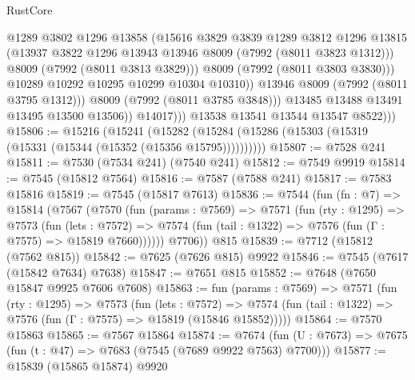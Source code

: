 \begin{lexlean}{RustCore}
\begin{coremodule}
                              @1289
                              @3802
                              @1296
                              @13858
                              (@15616
                                @3829
                                @3839
                                @1289
                                @3812
                                @1296
                                @13815
                                (@13937 @3822 @1296 @13943 @13946 @8009 (@7992 (@8011 @3823 @1312)))
                                @8009
                                (@7992 (@8011 @3813 @3829)))
                              @8009
                              (@7992 (@8011 @3803 @3830)))
                            @10289
                            @10292
                            @10295
                            @10299
                            @10304
                            @10310))
                        @13946
                        @8009
                        (@7992 (@8011 @3795 @1312)))
                      @8009
                      (@7992 (@8011 @3785 @3848)))
                    @13485
                    @13488
                    @13491
                    @13495
                    @13500
                    @13506))
                @14017)))
          @13538
          @13541
          @13544
          @13547
          @8522)))
@15806 := @15216
    (@15241 (@15282 (@15284 (@15286 (@15303 (@15319 (@15331 (@15344 (@15352 (@15356 @15795))))))))))
@15807 := @7528 @241
@15811 := @7530 (@7534 @241) (@7540 @241)
@15812 := @7549 @9919
@15814 := @7545 (@15812 @7564)
@15816 := @7587 (@7588 @241)
@15817 := @7583 @15816
@15819 := @7545 (@15817 @7613)
@15836 := @7544
    (fun (fn : @7) =>
    @15814
      (@7567
        (@7570
          (fun (params : @7569) =>
          @7571
            (fun (rty : @1295) =>
            @7573
              (fun (lets : @7572) =>
              @7574 (fun (tail : @1322) => @7576 (fun (Γ : @7575) => @15819 @7660))))))
        @7706))
    @815
@15839 := @7712 (@15812 (@7562 @815))
@15842 := @7625 (@7626 @815) @9922
@15846 := @7545 (@7617 (@15842 @7634) @7638)
@15847 := @7651 @815
@15852 := @7648 (@7650 @15847 @9925 @7606 @7608)
@15863 := fun (params : @7569) =>
  @7571
    (fun (rty : @1295) =>
    @7573
      (fun (lets : @7572) =>
      @7574 (fun (tail : @1322) => @7576 (fun (Γ : @7575) => @15819 (@15846 @15852)))))
@15864 := @7570 @15863
@15865 := @7567 @15864
@15874 := @7674
    (fun (U : @7673) => @7675 (fun (t : @47) => @7683 (@7545 (@7689 @9922 @7563) @7700)))
@15877 := @15839 (@15865 @15874) @9920

\end{coremodule}
\end{lexlean}
